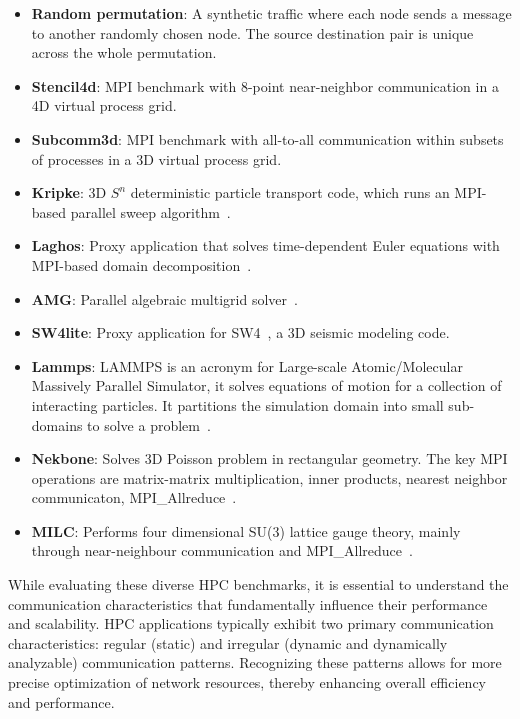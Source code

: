 \begin{itemize}
\item \textbf{Random permutation}: A synthetic traffic where each node sends a message to another randomly chosen node. The source destination pair is unique across the whole permutation.
\item \textbf{Stencil4d}: MPI benchmark with 8-point near-neighbor communication in a 4D virtual process grid.
\item \textbf{Subcomm3d}: MPI benchmark with all-to-all communication within subsets of processes in a 3D virtual process grid.
\item \textbf{Kripke}: 3D $S^n$ deterministic particle transport code, which runs an MPI-based parallel sweep algorithm~\cite{kripke}. 
\item \textbf{Laghos}: Proxy application that solves time-dependent Euler equations with MPI-based domain decomposition~\cite{laghos}.
\item \textbf{AMG}:  Parallel algebraic multigrid solver~\cite{amg}.
\item \textbf{SW4lite}: Proxy application for SW4~\cite{sjogreen2018sw4}, a 3D seismic modeling code.
\item \textbf{Lammps}: LAMMPS is an acronym for Large-scale Atomic/Molecular Massively Parallel Simulator, it solves equations of motion for a collection of interacting particles. It partitions the simulation domain into small sub-domains to solve a problem~\cite{thompson2022lammps}.
\item \textbf{Nekbone}: Solves 3D Poisson problem in rectangular geometry. The key MPI operations are matrix-matrix multiplication, inner products, nearest neighbor communicaton, MPI\_Allreduce~\cite{gong2016nekbone}.
\item \textbf{MILC}: Performs four dimensional SU(3) lattice gauge theory, mainly through near-neighbour communication and MPI\_Allreduce~\cite{gottlieb2001benchmarking}.
\end{itemize}

While evaluating these diverse HPC benchmarks, it is essential to understand the communication characteristics that fundamentally influence their performance and scalability. HPC applications typically exhibit two primary communication characteristics: regular (static) and irregular (dynamic and dynamically analyzable) communication patterns. Recognizing these patterns allows for more precise optimization of network resources, thereby enhancing overall efficiency and performance.


